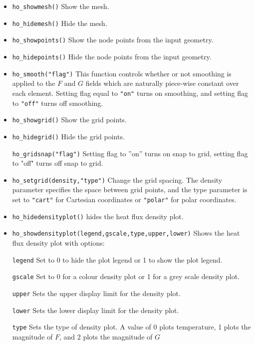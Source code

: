 \begin{itemize}
\item \texttt{ho\_showmesh()} Show the mesh.

\item \texttt{ho\_hidemesh()} Hide the mesh.

\item \texttt{ho\_showpoints()} Show the node points from the input geometry.

\item \texttt{ho\_hidepoints()} Hide the node points from the input geometry.

\item \texttt{ho\_smooth("flag")} This function controls whether or not smoothing is
applied to the $F$ and $G$ fields which are naturally piece-wise
constant over each element. Setting flag equal to \texttt{"on"}
turns on smoothing, and setting flag to \texttt{"off"} turns off
smoothing.

\item \texttt{ho\_showgrid()} Show the grid points.

\item \texttt{ho\_hidegrid()} Hide the grid points.

\texttt{ho\_gridsnap("flag")} Setting flag to ''on'' turns on snap to grid,
setting flag to "off" turns off snap to grid.

\item \texttt{ho\_setgrid(density,"type")} Change the grid spacing. The density
parameter specifies the space between grid points, and the type
parameter is set to \texttt{"cart"} for Cartesian coordinates or
\texttt{"polar"} for polar coordinates.

\item \texttt{ho\_hidedensityplot()} hides the heat flux density plot.

\item \texttt{ho\_showdensityplot(legend,gscale,type,upper,lower)} Shows the
heat flux density plot with options:

\texttt{legend} Set to 0 to hide the plot legend or 1 to show the plot
legend.

\texttt{gscale} Set to 0 for a colour density plot or 1 for a grey scale
density plot.

\texttt{upper} Sets the upper display limit for the density plot.

\texttt{lower} Sets the lower display limit for the density plot.

\texttt{type} Sets the type of density plot. A value of 0 plots temperature, 1
plots the magnitude of $F$, and 2 plots the magnitude of $G$


\end{itemize}
